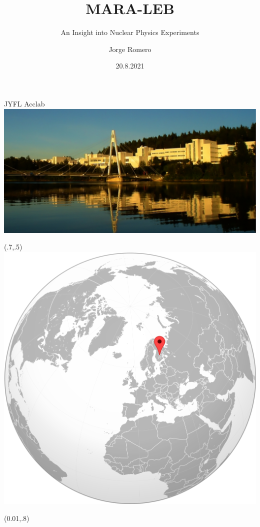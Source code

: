 \documentclass{beamer}
\title{MARA-LEB}
\subtitle{An Insight into Nuclear Physics Experiments}
\date{20.8.2021}
\author[auth]{Jorge Romero}
\institute[inst]{University of Liverpool, Jyväskylän Yliopisto}
\begin{document}
\begin{frame}
\titlepage
\end{frame}

\begin{frame}{JYFL Acclab}
    \centering
    \vspace*{4em}
    \hspace*{-3em}
    \includegraphics[scale=0.6]{assets/JYFL}
    \vfill
    \begin{textblock*}{0.3\paperwidth}(.7\paperwidth,.5\paperheight)
        \includegraphics[scale=0.07]{assets/JYFL_locator}
    \end{textblock*}
    \begin{textblock*}{0.7\paperwidth}(0.01\paperwidth,.8\paperheight)
        \color{white}{The northernmost accelerator laboratory in the world!}
    \end{textblock*}
\end{frame}
\end{document}

